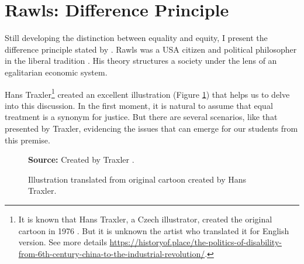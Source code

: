 \section{Rawls: Difference Principle}
\label{equity-sec:diff-prin}

Still developing the distinction between equality and equity, I present the difference principle stated by . Rawls was a \gls{USA} citizen and political philosopher in the liberal tradition \cite{wenar:2021}. His theory structures a society under the lens of an egalitarian economic system.

Hans Traxler\footnote{It is known that Hans Traxler, a Czech illustrator, created the original cartoon in 1976 \cite{traxler:2019}. But it is unknown the artist who translated it for English version. See more details \url{https://historyof.place/the-politics-of-disability-from-6th-century-china-to-the-industrial-revolution/}.} created an excellent illustration (Figure \ref{fig:fair-selection-traxler}) that helps us to delve into this discussion. In the first moment, it is natural to assume that equal treatment is a synonym for justice. But there are several scenarios, like that presented by Traxler, evidencing the issues that can emerge for our students from this premise. 

\begin{figure}[ht!]
\centering

\caption{\textmd{Illustration translated from original cartoon created by Hans Traxler.}}
\label{fig:fair-selection-traxler}

\par\medskip\ABNTEXfontereduzida\selectfont\textbf{Source:} Created by Traxler \cite{traxler:2019}.%
\end{figure}

